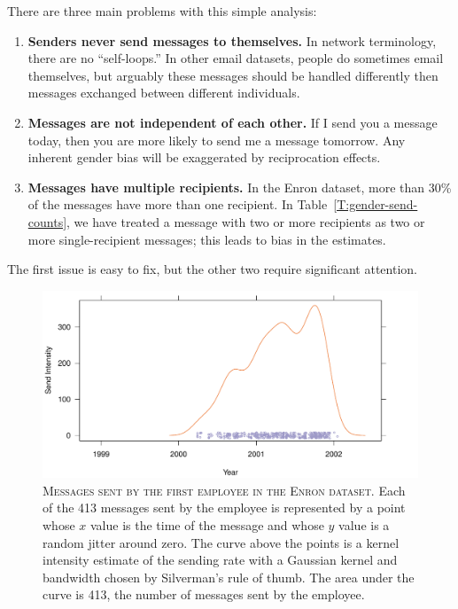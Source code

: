 \documentclass[aoas,preprint]{imsart}
\begin{document}
There are three main problems with this simple analysis:
\begin{enumerate}
    \item \textbf{Senders never send messages to themselves.} In network
    terminology, there are no ``self-loops.'' In other email datasets, people
    do sometimes email themselves, but arguably these messages should be
    handled differently then messages exchanged between different individuals.
    
    \item \textbf{Messages are not independent of each other.} If I send
    you a message today, then you are more likely to send me a message
    tomorrow.  Any inherent gender bias will be exaggerated by
    reciprocation effects.
    
    \item \textbf{Messages have multiple recipients.} In the Enron dataset,
    more than 30\% of the messages have more than one recipient.  In
    Table~\ref{T:gender-send-counts}, we have treated a message with two
    or more recipients as two or more single-recipient messages; this
    leads to bias in the estimates.
\end{enumerate}
The first issue is easy to fix, but the other two require significant
attention.


\begin{figure}
    \includegraphics[scale=0.6]{figures/kernel-intensity}
    \caption{
        \textsc{Messages sent by the first employee in the Enron dataset.}
        Each of the 413 messages sent by the employee is represented by a point
        whose $x$ value is the time of the message and whose $y$ value is a
        random jitter around zero.  The curve above the points is a kernel
        intensity estimate of the sending rate with a Gaussian kernel
        and bandwidth chosen by Silverman's rule of thumb.  The area
        under the curve is 413, the number of messages sent by the
        employee.
    }
    \label{F:kernel-intensity}
\end{figure}
\end{document}
